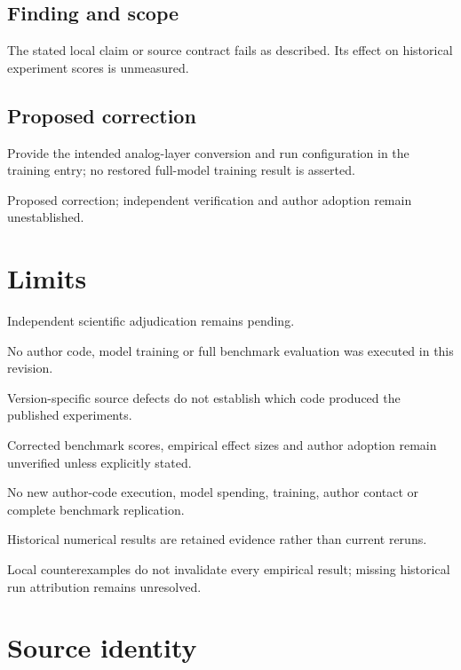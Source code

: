 \documentclass[11pt]{article}
\begin{document}
\subsection*{Finding and scope}

The stated local claim or source contract fails as described. Its effect on historical experiment scores is unmeasured.

\subsection*{Proposed correction}

Provide the intended analog-layer conversion and run configuration in the training entry; no restored full-model training result is asserted.

Proposed correction; independent verification and author adoption remain unestablished.

\section*{Limits}

Independent scientific adjudication remains pending.\par

No author code, model training or full benchmark evaluation was executed in this revision.\par

Version-specific source defects do not establish which code produced the published experiments.\par

Corrected benchmark scores, empirical effect sizes and author adoption remain unverified unless explicitly stated.\par

No new author-code execution, model spending, training, author contact or complete benchmark replication.\par

Historical numerical results are retained evidence rather than current reruns.\par

Local counterexamples do not invalidate every empirical result; missing historical run attribution remains unresolved.\par

\section*{Source identity}
\end{document}
